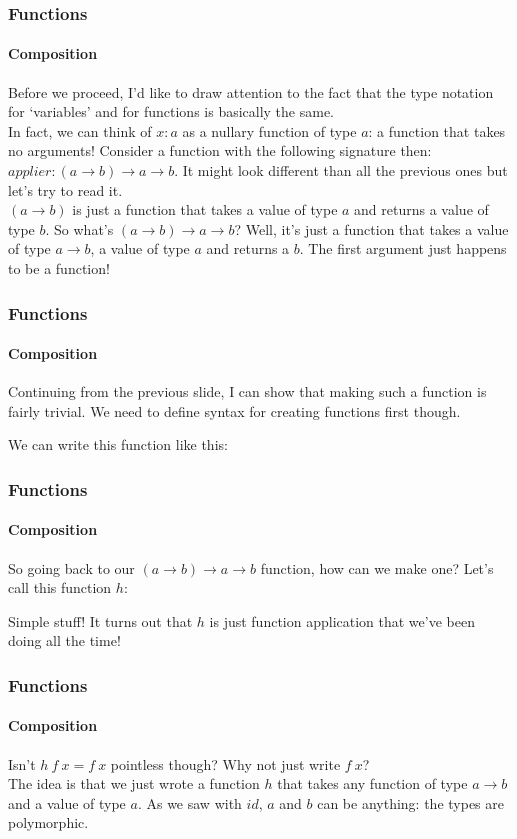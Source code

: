 \documentclass{beamer}
\begin{document}
\begin{frame}
  \frametitle{Functions}
  \framesubtitle{Composition}
  Before we proceed, I'd like to draw attention to the fact that the
  type notation for `variables' and for functions is basically the
  same.\\
  \pause
  In fact, we can think of $x:a$ as a nullary function of type $a$: a function that takes
  no arguments! Consider a function with the following signature then:
  $applier:(a \rightarrow b) \rightarrow a \rightarrow b$. It might
  look different than all the previous ones but let's try to read
  it.\\
  \pause
  $(a \rightarrow b)$ is just a function that takes a value of type
  $a$ and returns a value of type $b$. So what's $(a \rightarrow b)
  \rightarrow a \rightarrow b$? Well, it's just a function that takes a value of
  type $a \rightarrow b$, a value of type $a$ and returns a $b$. The
  first argument just happens to be a function!\\
  \pause
\end{frame}
\begin{frame}
  \frametitle{Functions}
  \framesubtitle{Composition}
  Continuing from the previous slide, I can show that making such a
  function is fairly trivial. We need to define syntax for creating
  functions first though.\\
  \pause
  
  We can write this function like this:
  
  \pause
\end{frame}
\begin{frame}
  \frametitle{Functions}
  \framesubtitle{Composition}
  So going back to our $(a \rightarrow b)
  \rightarrow a \rightarrow b$ function, how can we make one? Let's
  call this function $h$:
  
  \pause
  Simple stuff! It turns out that $h$ is just function application
  that we've been doing all the time!
\end{frame}
\begin{frame}
  \frametitle{Functions}
  \framesubtitle{Composition}
  Isn't $h\:f\:x = f\:x$ pointless though? Why not just write $f\:x$?\\
  \pause
  The idea is that we just wrote a function $h$ that takes any
  function of type $a \rightarrow b$ and a value of type $a$. As we saw with $id$,
  $a$ and $b$ can be anything: the types are polymorphic.
\end{frame}
\end{document}
